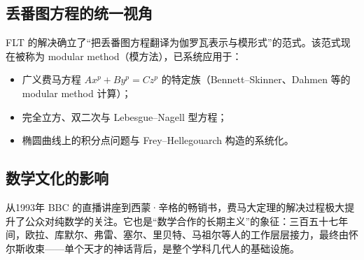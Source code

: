 \subsection{丢番图方程的统一视角}

FLT 的解决确立了“把丢番图方程翻译为伽罗瓦表示与模形式”的范式。该范式现在被称为 modular method（模方法），已系统应用于：

\begin{itemize}
    \item 广义费马方程 $A x^p + B y^p = C z^p$ 的特定族（Bennett--Skinner、Dahmen 等的 modular method 计算）；
    \item 完全立方、双二次与 Lebesgue--Nagell 型方程；
    \item 椭圆曲线上的积分点问题与 Frey--Hellegouarch 构造的系统化。
\end{itemize}

\subsection{数学文化的影响}

从1993年 BBC 的直播讲座到西蒙·辛格的畅销书，费马大定理的解决过程极大提升了公众对纯数学的关注。它也是“数学合作的长期主义”的象征：三百五十七年间，欧拉、库默尔、弗雷、塞尔、里贝特、马祖尔等人的工作层层接力，最终由怀尔斯收束——单个天才的神话背后，是整个学科几代人的基础设施。
